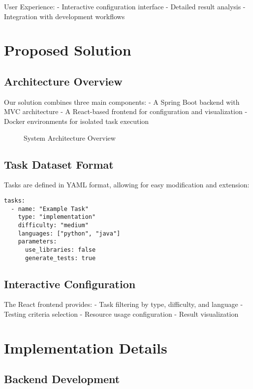 User Experience:
- Interactive configuration interface
- Detailed result analysis
- Integration with development workflows

\chapter{Proposed Solution}

\section{Architecture Overview}

Our solution combines three main components:
- A Spring Boot backend with MVC architecture
- A React-based frontend for configuration and visualization
- Docker environments for isolated task execution

\begin{figure}[h]
    \centering
    \caption{System Architecture Overview}
    \label{fig:architecture}
\end{figure}

\section{Task Dataset Format}

Tasks are defined in YAML format, allowing for easy modification and extension:

\begin{verbatim}
tasks:
  - name: "Example Task"
    type: "implementation"
    difficulty: "medium"
    languages: ["python", "java"]
    parameters:
      use_libraries: false
      generate_tests: true
\end{verbatim}

\section{Interactive Configuration}

The React frontend provides:
- Task filtering by type, difficulty, and language
- Testing criteria selection
- Resource usage configuration
- Result visualization

\chapter{Implementation Details}

\section{Backend Development}

